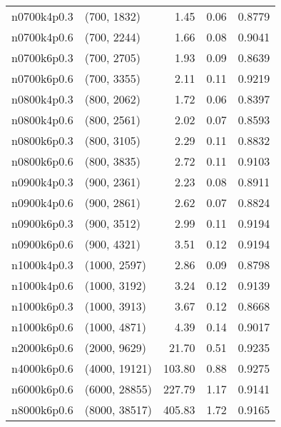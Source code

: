 \begin{tabular}{llrrr}
n0700k4p0.3 &   (700, 1832) &      1.45 &     0.06 & 0.8779 \\
n0700k4p0.6 &   (700, 2244) &      1.66 &     0.08 & 0.9041 \\
n0700k6p0.3 &   (700, 2705) &      1.93 &     0.09 & 0.8639 \\
n0700k6p0.6 &   (700, 3355) &      2.11 &     0.11 & 0.9219 \\
n0800k4p0.3 &   (800, 2062) &      1.72 &     0.06 & 0.8397 \\
n0800k4p0.6 &   (800, 2561) &      2.02 &     0.07 & 0.8593 \\
n0800k6p0.3 &   (800, 3105) &      2.29 &     0.11 & 0.8832 \\
n0800k6p0.6 &   (800, 3835) &      2.72 &     0.11 & 0.9103 \\
n0900k4p0.3 &   (900, 2361) &      2.23 &     0.08 & 0.8911 \\
n0900k4p0.6 &   (900, 2861) &      2.62 &     0.07 & 0.8824 \\
n0900k6p0.3 &   (900, 3512) &      2.99 &     0.11 & 0.9194 \\
n0900k6p0.6 &   (900, 4321) &      3.51 &     0.12 & 0.9194 \\
n1000k4p0.3 &  (1000, 2597) &      2.86 &     0.09 & 0.8798 \\
n1000k4p0.6 &  (1000, 3192) &      3.24 &     0.12 & 0.9139 \\
n1000k6p0.3 &  (1000, 3913) &      3.67 &     0.12 & 0.8668 \\
n1000k6p0.6 &  (1000, 4871) &      4.39 &     0.14 & 0.9017 \\
n2000k6p0.6 &  (2000, 9629) &     21.70 &     0.51 & 0.9235 \\
n4000k6p0.6 & (4000, 19121) &    103.80 &     0.88 & 0.9275 \\
n6000k6p0.6 & (6000, 28855) &    227.79 &     1.17 & 0.9141 \\
n8000k6p0.6 & (8000, 38517) &    405.83 &     1.72 & 0.9165 \\
\bottomrule
\end{tabular}
